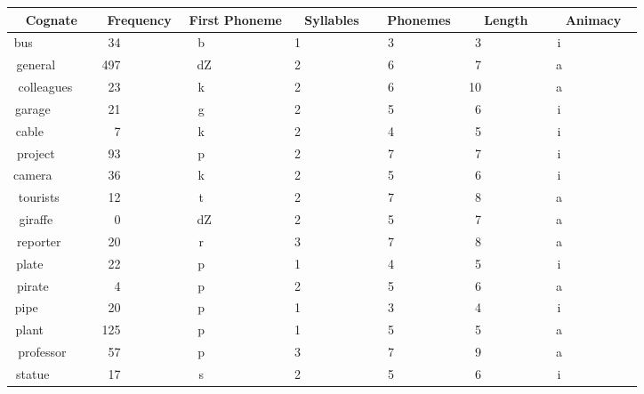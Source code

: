 %
\setlongtables
\begin{longtable}{|c|c|c|c|c|c|c|}
\hline
\multicolumn{1}{|c|}{Cognate}&\multicolumn{1}{c|}{Frequency}&\multicolumn{1}{c|}{First Phoneme}&\multicolumn{1}{c|}{Syllables}&\multicolumn{1}{c|}{Phonemes}&\multicolumn{1}{c|}{Length}&\multicolumn{1}{c|}{Animacy}\\ \hline
\endhead
\hline\endfoot
bus~~~~~~~~~&~34~~~~~~~~~&b~~~~~~~~~~~&1~~~~~~~~~~~&~3~~~~~~~~~~&~3~~~~~~~~~~&i~~~~~~~~~~~\\ 
general~~~~~&497~~~~~~~~~&dZ~~~~~~~~~~&2~~~~~~~~~~~&~6~~~~~~~~~~&~7~~~~~~~~~~&a~~~~~~~~~~~\\ 
colleagues~~&~23~~~~~~~~~&k~~~~~~~~~~~&2~~~~~~~~~~~&~6~~~~~~~~~~&10~~~~~~~~~~&a~~~~~~~~~~~\\ 
garage~~~~~~&~21~~~~~~~~~&g~~~~~~~~~~~&2~~~~~~~~~~~&~5~~~~~~~~~~&~6~~~~~~~~~~&i~~~~~~~~~~~\\ 
cable~~~~~~~&~~7~~~~~~~~~&k~~~~~~~~~~~&2~~~~~~~~~~~&~4~~~~~~~~~~&~5~~~~~~~~~~&i~~~~~~~~~~~\\ 
project~~~~~&~93~~~~~~~~~&p~~~~~~~~~~~&2~~~~~~~~~~~&~7~~~~~~~~~~&~7~~~~~~~~~~&i~~~~~~~~~~~\\ 
camera~~~~~~&~36~~~~~~~~~&k~~~~~~~~~~~&2~~~~~~~~~~~&~5~~~~~~~~~~&~6~~~~~~~~~~&i~~~~~~~~~~~\\ 
tourists~~~~&~12~~~~~~~~~&t~~~~~~~~~~~&2~~~~~~~~~~~&~7~~~~~~~~~~&~8~~~~~~~~~~&a~~~~~~~~~~~\\ 
giraffe~~~~~&~~0~~~~~~~~~&dZ~~~~~~~~~~&2~~~~~~~~~~~&~5~~~~~~~~~~&~7~~~~~~~~~~&a~~~~~~~~~~~\\ 
reporter~~~~&~20~~~~~~~~~&r~~~~~~~~~~~&3~~~~~~~~~~~&~7~~~~~~~~~~&~8~~~~~~~~~~&a~~~~~~~~~~~\\ 
plate~~~~~~~&~22~~~~~~~~~&p~~~~~~~~~~~&1~~~~~~~~~~~&~4~~~~~~~~~~&~5~~~~~~~~~~&i~~~~~~~~~~~\\ 
pirate~~~~~~&~~4~~~~~~~~~&p~~~~~~~~~~~&2~~~~~~~~~~~&~5~~~~~~~~~~&~6~~~~~~~~~~&a~~~~~~~~~~~\\ 
pipe~~~~~~~~&~20~~~~~~~~~&p~~~~~~~~~~~&1~~~~~~~~~~~&~3~~~~~~~~~~&~4~~~~~~~~~~&i~~~~~~~~~~~\\ 
plant~~~~~~~&125~~~~~~~~~&p~~~~~~~~~~~&1~~~~~~~~~~~&~5~~~~~~~~~~&~5~~~~~~~~~~&a~~~~~~~~~~~\\ 
professor~~~&~57~~~~~~~~~&p~~~~~~~~~~~&3~~~~~~~~~~~&~7~~~~~~~~~~&~9~~~~~~~~~~&a~~~~~~~~~~~\\ 
statue~~~~~~&~17~~~~~~~~~&s~~~~~~~~~~~&2~~~~~~~~~~~&~5~~~~~~~~~~&~6~~~~~~~~~~&i~~~~~~~~~~~\\ 

\end{longtable}
